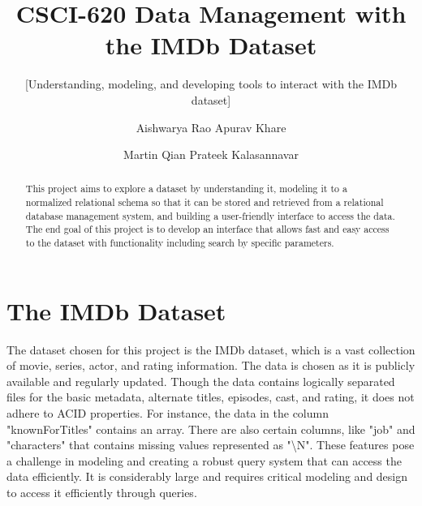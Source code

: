 \documentclass{sig-alternate}
\title{CSCI-620 Data Management with the IMDb Dataset}
\subtitle{[Understanding, modeling, and developing tools to interact with the IMDb dataset]}
\author
{
\alignauthor
  Aishwarya Rao
  \email{ar2711@rit.edu}
\alignauthor
  Apurav Khare
  \email{ak2816@rit.edu}
\and
\alignauthor
  Martin Qian
  \email{jq3513@rit.edu}
\alignauthor
  Prateek Kalasannavar
  \email{pk6685@rit.edu}
}
\begin{document}
\maketitle
\begin{abstract}
This project aims to explore a dataset by understanding it, modeling it to a normalized relational schema so that it can be stored and retrieved from a relational database management system, and building a user-friendly interface to access the data. The end goal of this project is to develop an interface that allows fast and easy access to the dataset with functionality including search by specific parameters. 
\end{abstract}

\section{The IMDb Dataset}
The dataset chosen for this project is the IMDb dataset, which is a vast collection of movie, series, actor, and rating information. The data is chosen as it is publicly available and regularly updated. Though the data contains logically separated files for the basic metadata, alternate titles, episodes, cast, and rating, it does not adhere to ACID properties. For instance, the data in the column "knownForTitles" contains an array. There are also certain columns, like "job" and "characters" that contains missing values represented as "\textbackslash N". These features pose a challenge in modeling and creating a robust query system that can access the data efficiently. It is considerably large and requires critical modeling and design to access it efficiently through queries.
\end{document}
